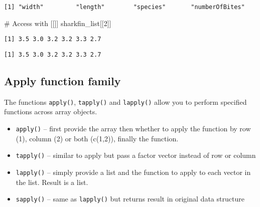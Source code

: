 \documentclass[
  letterpaper,
  DIV=11,
  numbers=noendperiod]{scrartcl}
\newenvironment{Shaded}{\begin{snugshade}}{\end{snugshade}}
\newcommand{\CommentTok}[1]{\textcolor[rgb]{0.37,0.37,0.37}{#1}}
\newcommand{\DecValTok}[1]{\textcolor[rgb]{0.68,0.00,0.00}{#1}}
\newcommand{\NormalTok}[1]{\textcolor[rgb]{0.00,0.23,0.31}{#1}}
\newcommand{\SpecialCharTok}[1]{\textcolor[rgb]{0.37,0.37,0.37}{#1}}
\providecommand{\tightlist}{%
  \setlength{\itemsep}{0pt}\setlength{\parskip}{0pt}}\usepackage{longtable,booktabs,array}
\begin{document}
\begin{verbatim}
[1] "width"         "length"        "species"       "numberOfBites"
\end{verbatim}

\begin{Shaded}
\begin{Highlighting}[]
\CommentTok{\# Access with [[]]}
\NormalTok{sharkfin\_list[[}\DecValTok{2}\NormalTok{]]}
\end{Highlighting}
\end{Shaded}

\begin{verbatim}
[1] 3.5 3.0 3.2 3.2 3.3 2.7
\end{verbatim}

\begin{Shaded}
\end{Shaded}

\begin{verbatim}
[1] 3.5 3.0 3.2 3.2 3.3 2.7
\end{verbatim}

\subsection{Apply function family}\label{apply-function-family}

The functions \texttt{apply()}, \texttt{tapply()} and \texttt{lapply()}
allow you to perform specified functions across array objects.

\begin{itemize}
\tightlist
\item
  \texttt{apply()} -- first provide the array then whether to apply the
  function by row (1), column (2) or both (c(1,2)), finally the
  function.
\item
  \texttt{tapply()} -- similar to apply but pass a factor vector instead
  of row or column
\item
  \texttt{lapply()} -- simply provide a list and the function to apply
  to each vector in the list. Result is a list.
\item
  \texttt{sapply()} -- same as \texttt{lapply()} but returns result in
  original data structure
\end{itemize}
\end{document}
